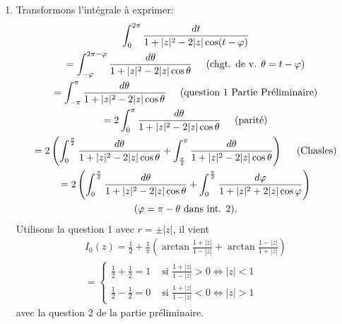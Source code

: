 \begin{enumerate}
 \item Transformons  l'intégrale à exprimer:
\begin{multline*}
\int_0^{2\pi}\frac{dt}{1 + |z|^2 - 2|z|\cos(t-\varphi)} \\
 = \int_{-\varphi}^{2\pi - \varphi}\frac{d\theta}{1 + |z|^2 - 2|z|\cos \theta} \hspace{0.5cm} \text{(chgt. de v. $\theta = t - \varphi$)}\\
 = \int_{-\pi}^{\pi}\frac{d\theta}{1 + |z|^2 - 2|z|\cos \theta} \hspace{0.5cm} \text{(question 1 Partie Préliminaire)} \\
 = 2 \int_{0}^{\pi}\frac{d\theta}{1 + |z|^2 - 2|z|\cos \theta} \hspace{0.5cm} \text{(parité)} \\
 = 2 \left( \int_{0}^{\frac{\pi}{2}}\frac{d\theta}{1 + |z|^2 - 2|z|\cos \theta} + \int_{\frac{\pi}{2}}^{\pi}\frac{d\theta}{1 + |z|^2 - 2|z|\cos \theta}\right) \hspace{0.5cm} \text{(Chasles)} \\
 = 2 \left( \int_{0}^{\frac{\pi}{2}}\frac{d\theta}{1 + |z|^2 - 2|z|\cos \theta} + \int_{0}^{\frac{\pi}{2}}\frac{d\varphi}{1 + |z|^2 + 2|z|\cos \varphi}\right) \\
 \text{($\varphi = \pi - \theta$ dans int. 2).}
\end{multline*}
Utilisons la question 1 avec $r = \pm |z|$, il vient
\begin{multline*}
I_0(z) = \frac{1}{2} + \frac{1}{\pi}\left( \arctan\frac{1+|z|}{1-|z|} + \arctan\frac{1-|z|}{1+|z|}\right) \\
=
\left\lbrace 
\begin{aligned}
 \frac{1}{2} + \frac{1}{2}=1 &\text{ si } \frac{1+|z|}{1-|z|}>0 \Leftrightarrow |z| < 1 \\
 \frac{1}{2} - \frac{1}{2}=0 &\text{ si } \frac{1+|z|}{1-|z|}<0 \Leftrightarrow |z| > 1 
\end{aligned}
\right. 
\end{multline*}
avec la question 2 de la partie préliminaire.
\end{enumerate}


